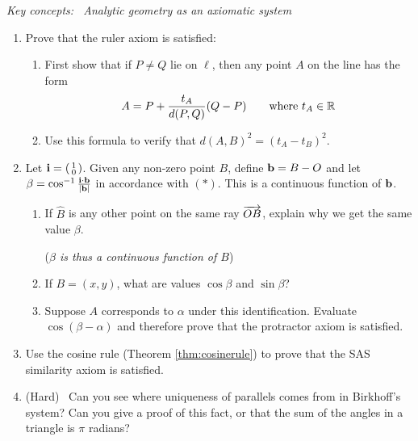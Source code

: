 \begin{exercises}
\hangindent\leftmargini\emph{Key concepts: \ Analytic geometry as an axiomatic system}

	\begin{enumerate}
		\item Prove that the ruler axiom is satisfied:
	  \begin{enumerate}
	    \item First show that if $P\neq Q$ lie on $\ell$, then any point $A$ on the line has the form
			\[
				A=P+\frac{t_A}{d(P,Q)}(Q-P)
				\qquad\text{where }
				t_A\in\mathbb{R}
			\]
			\item Use this formula to verify that $d(A,B)^2=(t_A-t_B)^2$.
		\end{enumerate}
		
		
		\item Let ${\mathbf{i}}=\left(\begin{smallmatrix}1\\0\end{smallmatrix}\right)$. Given any non-zero point $B$, define ${\mathbf{b}}=B-O$ and let $\beta=\cos^{-1}\frac{{\mathbf{i}}\cdot{\mathbf{b}}}{\left| {\mathbf{b}}\right|}$ in accordance with $(\ast)$. This is a continuous function of ${\mathbf{b}}$.
		\begin{enumerate}
		  \item If $\hat B$ is any other point on the same ray $\overrightarrow{OB}$, explain why we get the same value $\beta$.\par
		  (\emph{$\beta$ is thus a continuous function of $B$})
		  \item If $B=(x,y)$, what are values $\cos\beta$ and $\sin\beta$?
		  \item	Suppose $A$ corresponds to $\alpha$ under this identification. Evaluate $\cos(\beta-\alpha)$ and therefore prove that the protractor axiom is satisfied.
		\end{enumerate}
		
		
		\item Use the cosine rule (Theorem \ref{thm:cosinerule}) to prove that the SAS similarity axiom is satisfied.
		
		
		\item (Hard) \ Can you see where uniqueness of parallels comes from in Birkhoff's system? Can you give a proof of this fact, or that the sum of the angles in a triangle is $\pi$ radians?
	\end{enumerate}
\end{exercises}


\clearpage



